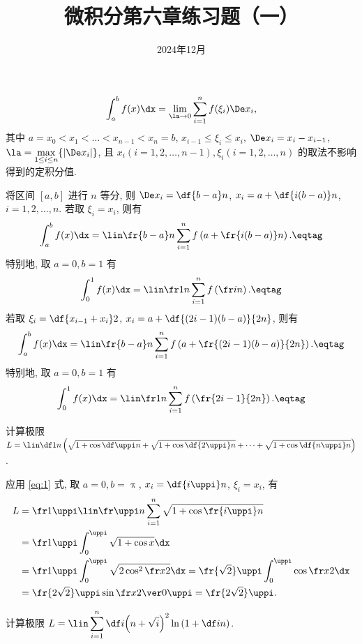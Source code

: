 \documentclass{ctexart}
\date{2024年12月}
\title{微积分第六章练习题（一）}
\begin{document}
\maketitle

\renewcommand{\thedefinition}{\arabic{definition}}
\renewcommand{\thetheorem}{\arabic{theorem}}
\renewcommand{\theexercise}{\arabic{exercise}}

\begin{definition}[定积分]
    \[
        \int_a^bf(x)\dx=\lim_{\la\to0}\sum_{i=1}^nf(\xi_i)\De x_i,
    \] 其中 $a=x_0<x_1<\dots<x_{n-1}<x_n=b$, $x_{i-1}\le\xi_i\le x_i$, $\De x_i=x_i-x_{i-1}$, $\la=\max\limits_{1\le i\le n}\{|\De x_i|\}$, 且 $x_i(i=1,2,\dots,n-1),\xi_i(i=1,2,\dots,n)$ 的取法不影响得到的定积分值.
\end{definition}

将区间 $[a,b]$ 进行 $n$ 等分, 则 $\De x_i=\df{b-a}n$, $x_i=a+\df{i(b-a)}n$, $i=1,2,\dots,n$. 若取 $\xi_i=x_i$, 则有 \[
    \int_a^bf(x)\dx=\lin\fr{b-a}n\sum_{i=1}^nf\left(a+\fr{i(b-a)}n\right).\eqtag\label{eq:1}
\] 特别地, 取 $a=0,b=1$ 有 \[
    \int_0^1f(x)\dx=\lin\fr1n\sum_{i=1}^nf\left(\fr in\right).\eqtag\label{eq:2}
\] 若取 $\xi_i=\df{x_{i-1}+x_i}2$, $x_i=a+\df{(2i-1)(b-a)}{2n}$, 则有 \[
    \int_a^bf(x)\dx=\lin\fr{b-a}n\sum_{i=1}^nf\left(a+\fr{(2i-1)(b-a)}{2n}\right).\eqtag\label{eq:3}
\] 特别地, 取 $a=0,b=1$ 有 \[
    \int_0^1f(x)\dx=\lin\fr1n\sum_{i=1}^nf\left(\fr{2i-1}{2n}\right).\eqtag\label{eq:4}
\]

\begin{exercise}
    计算极限 $L=\lin\df1n\left(\sqrt{1+\cos\df\uppi n}+\sqrt{1+\cos\df{2\uppi}n}+\dots+\sqrt{1+\cos\df{n\uppi}n}\right)$.
\end{exercise}

\begin{solution}
    应用 \eqref{eq:1} 式, 取 $a=0,b=\uppi$, $x_i=\df{i\uppi}n$, $\xi_i=x_i$, 有 \[\begin{aligned}
        L&=\fr1\uppi\lin\fr\uppi n\sum_{i=1}^n\sqrt{1+\cos\fr{i\uppi}n}\\
        &=\fr1\uppi\int_0^\uppi\sqrt{1+\cos x}\dx\\
        &=\fr1\uppi\int_0^\uppi\sqrt{2\cos^2\fr x2}\dx=\fr{\sqrt2}\uppi\int_0^\uppi\cos\fr x2\dx\\
        &=\fr{2\sqrt2}\uppi\sin\fr x2\ver0\uppi=\fr{2\sqrt2}\uppi.
    \end{aligned}\]
\end{solution}

\begin{exercise}
    计算极限 $L=\lin\displaystyle\sum_{i=1}^n\df i{\left(n+\sqrt i\right)^2}\ln\left(1+\df in\right)$.
\end{exercise}
\end{document}
